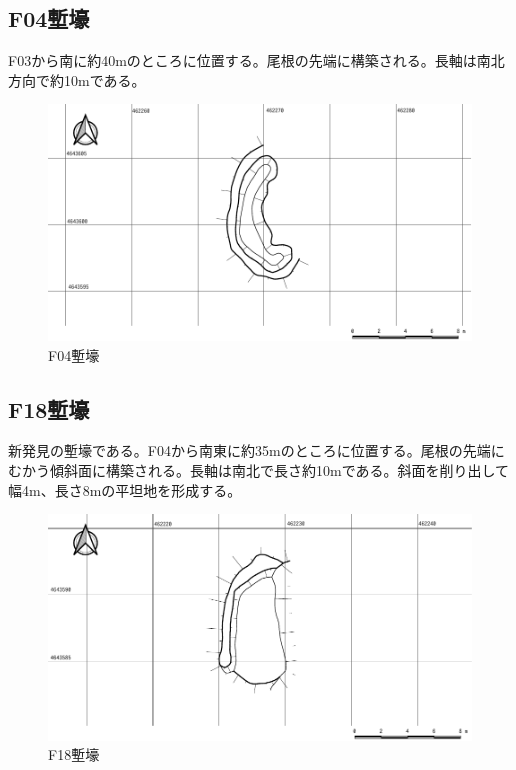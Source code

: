 \documentclass[14Q]{jsarticle}
\begin{document}
\subsection{F04塹壕}
F03から南に約40mのところに位置する。尾根の先端に構築される。長軸は南北方向で約10mである。

\begin{figure}[h]
\centering
\includegraphics[width=160truemm]{fig/F04.pdf}
\caption{F04塹壕}
\label{f04}
\end{figure}

\subsection{F18塹壕}
新発見の塹壕である。F04から南東に約35mのところに位置する。尾根の先端にむかう傾斜面に構築される。長軸は南北で長さ約10mである。斜面を削り出して幅4m、長さ8mの平坦地を形成する。

\begin{figure}[h]
\centering
\includegraphics[width=160truemm]{fig/F18.pdf}
\caption{F18塹壕}
\label{f18}
\end{figure}

\end{document}
